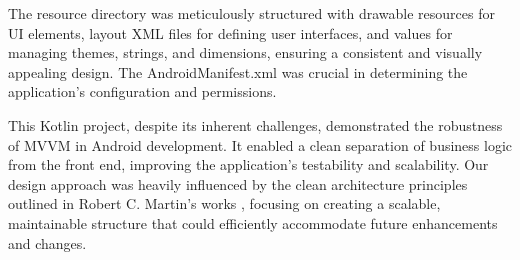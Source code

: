 \par
The resource directory was meticulously structured with drawable resources for UI elements, layout XML files for defining user interfaces, and values for managing themes, strings, and dimensions, ensuring a consistent and visually appealing design. The AndroidManifest.xml was crucial in determining the application's configuration and permissions.
\par
This Kotlin project, despite its inherent challenges, demonstrated the robustness of MVVM in Android development. It enabled a clean separation of business logic from the front end, improving the application's testability and scalability. Our design approach was heavily influenced by the clean architecture principles outlined in Robert C. Martin's works \cite{martin2009clean}, focusing on creating a scalable, maintainable structure that could efficiently accommodate future enhancements and changes.

